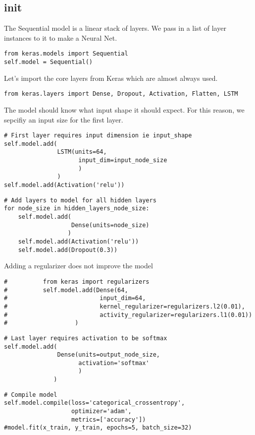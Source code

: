 \documentclass[11pt]{article}
\begin{document}
\subsection{init}
\label{sec:orgaf99986}
The Sequential model is a linear stack of layers. We pass in a list of layer instances to it to make a Neural Net.
\begin{verbatim}
from keras.models import Sequential
self.model = Sequential()
\end{verbatim}

Let's import the core layers from Keras which are almost always used.
\begin{verbatim}
from keras.layers import Dense, Dropout, Activation, Flatten, LSTM
\end{verbatim}

The model should know what input shape it should expect. For this reason, we sepcifiy an input size for the first layer.
\begin{verbatim}
# First layer requires input dimension ie input_shape
self.model.add(
               LSTM(units=64,
                     input_dim=input_node_size
                     )
               )
self.model.add(Activation('relu'))
\end{verbatim}

\begin{verbatim}
# Add layers to model for all hidden layers
for node_size in hidden_layers_node_size:
    self.model.add(
                   Dense(units=node_size)
                  )
    self.model.add(Activation('relu'))
    self.model.add(Dropout(0.3))
\end{verbatim}

Adding a regularizer does not improve the model
\begin{verbatim}
#          from keras import regularizers
#          self.model.add(Dense(64,
#                          input_dim=64,
#                          kernel_regularizer=regularizers.l2(0.01),
#                          activity_regularizer=regularizers.l1(0.01))
#                   )
\end{verbatim}

\begin{verbatim}
# Last layer requires activation to be softmax
self.model.add(
               Dense(units=output_node_size,
                     activation='softmax'
                     )
              )
\end{verbatim}


\begin{verbatim}
# Compile model
self.model.compile(loss='categorical_crossentropy',
                   optimizer='adam',
                   metrics=['accuracy'])
#model.fit(x_train, y_train, epochs=5, batch_size=32)
\end{verbatim}
\end{document}
